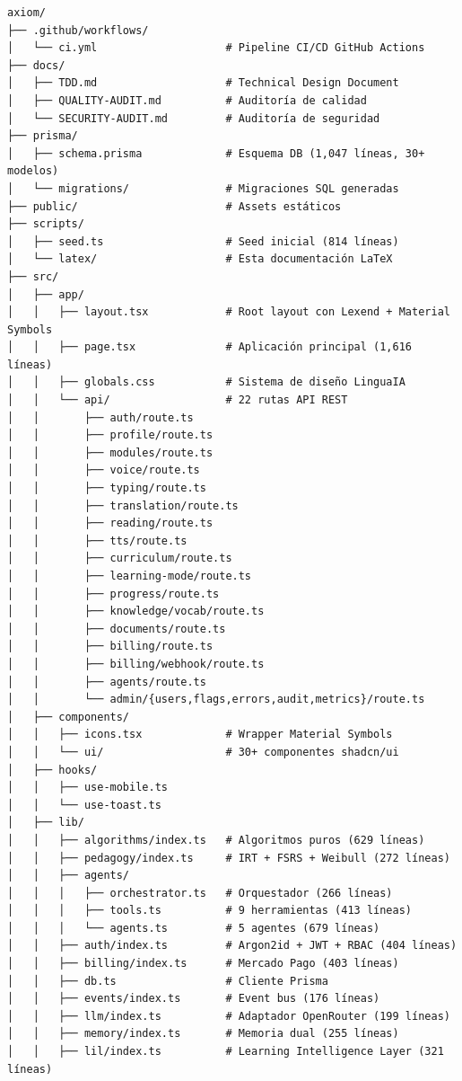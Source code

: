 \documentclass[10pt,a4paper,oneside]{report}
\begin{document}
\begin{lstlisting}[style=bash,caption={Estructura de directorios}]
axiom/
├── .github/workflows/
│   └── ci.yml                    # Pipeline CI/CD GitHub Actions
├── docs/
│   ├── TDD.md                    # Technical Design Document
│   ├── QUALITY-AUDIT.md          # Auditoría de calidad
│   └── SECURITY-AUDIT.md         # Auditoría de seguridad
├── prisma/
│   ├── schema.prisma             # Esquema DB (1,047 líneas, 30+ modelos)
│   └── migrations/               # Migraciones SQL generadas
├── public/                       # Assets estáticos
├── scripts/
│   ├── seed.ts                   # Seed inicial (814 líneas)
│   └── latex/                    # Esta documentación LaTeX
├── src/
│   ├── app/
│   │   ├── layout.tsx            # Root layout con Lexend + Material Symbols
│   │   ├── page.tsx              # Aplicación principal (1,616 líneas)
│   │   ├── globals.css           # Sistema de diseño LinguaIA
│   │   └── api/                  # 22 rutas API REST
│   │       ├── auth/route.ts
│   │       ├── profile/route.ts
│   │       ├── modules/route.ts
│   │       ├── voice/route.ts
│   │       ├── typing/route.ts
│   │       ├── translation/route.ts
│   │       ├── reading/route.ts
│   │       ├── tts/route.ts
│   │       ├── curriculum/route.ts
│   │       ├── learning-mode/route.ts
│   │       ├── progress/route.ts
│   │       ├── knowledge/vocab/route.ts
│   │       ├── documents/route.ts
│   │       ├── billing/route.ts
│   │       ├── billing/webhook/route.ts
│   │       ├── agents/route.ts
│   │       └── admin/{users,flags,errors,audit,metrics}/route.ts
│   ├── components/
│   │   ├── icons.tsx             # Wrapper Material Symbols
│   │   └── ui/                   # 30+ componentes shadcn/ui
│   ├── hooks/
│   │   ├── use-mobile.ts
│   │   └── use-toast.ts
│   ├── lib/
│   │   ├── algorithms/index.ts   # Algoritmos puros (629 líneas)
│   │   ├── pedagogy/index.ts     # IRT + FSRS + Weibull (272 líneas)
│   │   ├── agents/
│   │   │   ├── orchestrator.ts   # Orquestador (266 líneas)
│   │   │   ├── tools.ts          # 9 herramientas (413 líneas)
│   │   │   └── agents.ts         # 5 agentes (679 líneas)
│   │   ├── auth/index.ts         # Argon2id + JWT + RBAC (404 líneas)
│   │   ├── billing/index.ts      # Mercado Pago (403 líneas)
│   │   ├── db.ts                 # Cliente Prisma
│   │   ├── events/index.ts       # Event bus (176 líneas)
│   │   ├── llm/index.ts          # Adaptador OpenRouter (199 líneas)
│   │   ├── memory/index.ts       # Memoria dual (255 líneas)
│   │   ├── lil/index.ts          # Learning Intelligence Layer (321 líneas)

\end{lstlisting}
\end{document}
